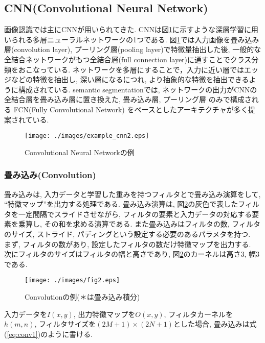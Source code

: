 \subsection{CNN(Convolutional Neural Network)}\label{subsec:cnn}
画像認識では主にCNN\cite{cnn}が用いられてきた. CNNは図\ref{fig:conv_ex}に示すような深層学習に用いられる多層ニューラルネットワークの1つである. 図\ref{fig:conv_ex}では入力画像を畳み込み層(convolution layer), プーリング層(pooling layer)で特徴量抽出した後, 一般的な全結合ネットワークがもつ全結合層(full connection layer)に通すことでクラス分類をおこなっている. ネットワークを多層にすることで，入力に近い層ではエッジなどの特徴を抽出し, 深い層になるにつれ, より抽象的な特徴を抽出できるように構成されている. semantic segmentationでは, ネットワークの出力がCNNの全結合層を畳み込み層に置き換えた, 畳み込み層, プーリング層 のみで構成される FCN(Fully Convolutional Network)\cite{long2015fully} をベースとしたアーキテクチャが多く提案されている. 
\begin{figure}[H]
  \centering
  \texttt{[image: ./images/example\_cnn2.eps]}
  \caption{Convolutional Neural Networkの例}
  \label{fig:conv_ex}
\end{figure}
\subsubsection*{畳み込み(Convolution)}
畳み込みは, 入力データと学習した重みを持つフィルタとで畳み込み演算をして, ``特徴マップ''を出力する処理である. 畳み込み演算は, 図\ref{fig:conv}の灰色で表したフィルタを一定間隔でスライドさせながら, フィルタの要素と入力データの対応する要素を乗算し, その和を求める演算である. また畳み込みはフィルタの数, フィルタのサイズ, ストライド, パディングという設定する必要のあるパラメタを持つ. \\
まず, フィルタの数があり, 設定したフィルタの数だけ特徴マップを出力する. \\
次にフィルタのサイズはフィルタの幅と高さであり, 図\ref{fig:conv}のカーネルは高さ3, 幅3である. 
\begin{figure}[H]
    \centering
    \texttt{[image: ./images/fig2.eps]}
    \caption{Convolutionの例(＊は畳み込み積分)}
    \label{fig:conv}
\end{figure}

入力データを$I(x, y)$, 出力特徴マップを$O(x, y)$, フィルタカーネルを$h(m, n)$, フィルタサイズを$(2M+1)\times(2N+1)$とした場合, 畳み込みは式(\ref{eq:conv1})のように書ける.

